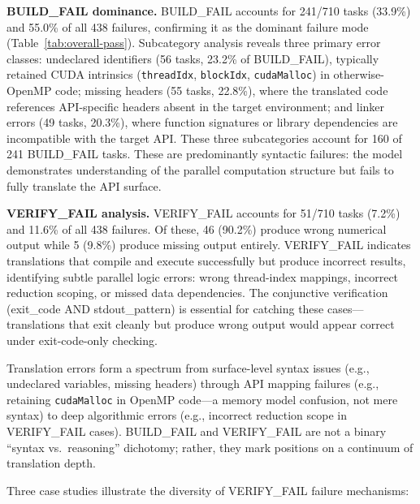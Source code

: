 \documentclass{article}
\newcommand{\buildfail}{\textsc{BUILD\_FAIL}}
\newcommand{\verifyfail}{\textsc{VERIFY\_FAIL}}
\begin{document}
\textbf{\buildfail{} dominance.} \buildfail{} accounts for 241/710 tasks (33.9\%) and 55.0\% of all 438 failures, confirming it as the dominant failure mode (Table~\ref{tab:overall-pass}). Subcategory analysis reveals three primary error classes: undeclared identifiers (56 tasks, 23.2\% of \buildfail{}), typically retained CUDA intrinsics (\texttt{threadIdx}, \texttt{blockIdx}, \texttt{cudaMalloc}) in otherwise-OpenMP code; missing headers (55 tasks, 22.8\%), where the translated code references API-specific headers absent in the target environment; and linker errors (49 tasks, 20.3\%), where function signatures or library dependencies are incompatible with the target API. These three subcategories account for 160 of 241 \buildfail{} tasks. These are predominantly syntactic failures: the model demonstrates understanding of the parallel computation structure but fails to fully translate the API surface.

\textbf{\verifyfail{} analysis.} \verifyfail{} accounts for 51/710 tasks (7.2\%) and 11.6\% of all 438 failures. Of these, 46 (90.2\%) produce wrong numerical output while 5 (9.8\%) produce missing output entirely. \verifyfail{} indicates translations that compile and execute successfully but produce incorrect results, identifying subtle parallel logic errors: wrong thread-index mappings, incorrect reduction scoping, or missed data dependencies. The conjunctive verification (exit\_code AND stdout\_pattern) is essential for catching these cases---translations that exit cleanly but produce wrong output would appear correct under exit-code-only checking.

Translation errors form a spectrum from surface-level syntax issues
(e.g., undeclared variables, missing headers) through API mapping
failures (e.g., retaining \texttt{cudaMalloc} in OpenMP code---a
memory model confusion, not mere syntax) to deep algorithmic
errors (e.g., incorrect reduction scope in \verifyfail{} cases).
\buildfail{} and \verifyfail{}{} are not a binary ``syntax vs.\ reasoning''
dichotomy; rather, they mark positions on a continuum of translation
depth.

Three case studies illustrate the diversity of \verifyfail{} failure mechanisms:
\end{document}
